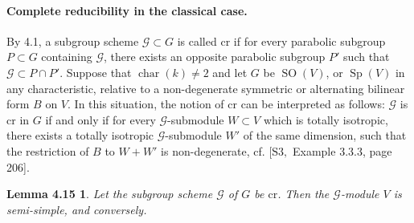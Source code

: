 \documentclass[11pt]{article}
\newtheorem*{lemma415}{Lemma 4.15}
\newcommand{\SO}{\operatorname{SO}}
\newcommand{\Sp}{\operatorname{Sp}}
\begin{document}
\paragraph{Complete reducibility in the classical case.}
By 4.1, a subgroup scheme \(\mathcal G\subset G\) is called \(\mathrm{cr}\) if for
every parabolic subgroup \(P\subset G\) containing \(\mathcal G\), there exists an
opposite parabolic subgroup \(P'\) such that \(\mathcal G\subset P\cap P'\). Suppose
that \(\operatorname{char}(k)\ne2\) and let \(G\) be \(\SO(V)\), or \(\Sp(V)\) in any
characteristic, relative to a non-degenerate symmetric or alternating bilinear form
\(B\) on \(V\). In this situation, the notion of \(\mathrm{cr}\) can be interpreted as
follows: \(\mathcal G\) is \(\mathrm{cr}\) in \(G\) if and only if for every
\(\mathcal G\)-submodule \(W\subset V\) which is totally isotropic, there exists a
totally isotropic \(\mathcal G\)-submodule \(W'\) of the same dimension, such that the
restriction of \(B\) to \(W+W'\) is non-degenerate, cf. \([\mathrm{S3},\) Example
3.3.3, page 206].

\begin{lemma415}
Let the subgroup scheme \(\mathcal G\) of \(G\) be \(\mathrm{cr}\). Then the
\(\mathcal G\)-module \(V\) is semi-simple, and conversely.
\end{lemma415}
\end{document}
